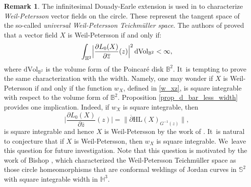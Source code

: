 \documentclass[10pt]{amsart}
\theoremstyle{plain}
\theoremstyle{definition}
\newtheorem{remark}[cor]{Remark}
\begin{document}
\begin{remark}\label{remark_weil_petersson}
The infinitesimal Douady-Earle extension is used in \cite{integral_operator_Zygmund} to characterize \emph{Weil-Petersson} vector fields on the circle. These represent the tangent space of the so-called \emph{universal Weil-Petersson Teichmüller space}. The authors of \cite{integral_operator_Zygmund} proved that a vector field $X$ is Weil-Petersson if and only if:
\[ \int_{\mathbb{H}^2} \Bigl|\frac{\partial L_0(X)}{\partial \overline{z}}(z)\Bigr| ^2 \, \mathrm{d}\mathrm{Vol}_{\mathbb{B}^2} <\infty,\] where $\mathrm{d}\mathrm{Vol}_{\mathbb{B}^2} $ is the volume form of the Poincaré disk $\mathbb{B}^2$. It~is tempting to prove the same characterization with the width. Namely, one may wonder if $X$ is Weil-Petersson if and only if the function $w_X$, defined in \eqref{w_xz}, is square integrable with respect to the volume form of $\mathbb{B}^2$. Proposition \ref{prop_d_bar_less_width} provides one implication. Indeed, if $w_X$ is square integrable, then
\[
\biggl|\frac{\partial L_0(X)}{\partial \overline{z}}(z)\biggr| =\rVert\overline{\partial}\mathrm{HL}(X)_{G^{-1}(z)}\lVert,
\]
is square integrable and hence $X$ is Weil-Petersson by the work of \cite{integral_operator_Zygmund}. It~is natural to conjecture that if $X$ is Weil-Petersson, then $w_X$ is square integrable. We~leave this question for future investigation. Note that this question is motivated by the work of Bishop \cite{bishop}, which characterized the Weil-Petersson Teichmüller space as those circle homeomorphisms that are conformal weldings of Jordan curves in $\mathbb{S}^2$ with square integrable width in $\mathbb{H}^3$.
\end{remark}
\end{document}
